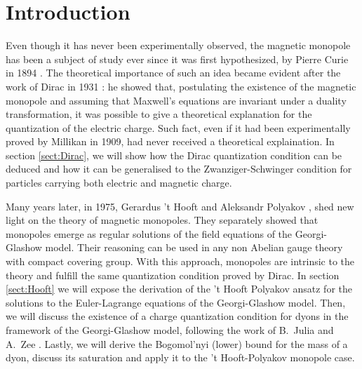 \documentclass[main.tex]{subfiles}
\begin{document}
\section{Introduction}

Even though it has never been experimentally observed, the magnetic monopole has been a subject of study ever since it was first hypothesized, by Pierre Curie in 1894 \cite{Curie:Monopole}.
The theoretical importance of such an idea became evident after the work of Dirac in 1931 \cite{Dirac}: he showed that, postulating the existence of the magnetic monopole and assuming that Maxwell's equations are invariant under a duality transformation, it was possible to give a theoretical explanation for the quantization of the electric charge.
Such fact, even if it had been experimentally proved by Millikan in 1909, had never received a theoretical explaination.
In section \ref{sect:Dirac}, we will show how the Dirac quantization condition can be deduced and how it can be generalised to the Zwanziger-Schwinger condition for particles carrying both electric and magnetic charge.

Many years later, in 1975, Gerardus 't Hooft \cite{Hof:mon} and Aleksandr Polyakov \cite{Pol:mon}, shed new light on the theory of magnetic monopoles.
They separately showed that monopoles emerge as regular solutions of the field equations of the Georgi-Glashow model. 
Their reasoning can be used in any non Abelian gauge theory with compact covering group.
With this approach, monopoles are intrinsic to the theory and fulfill the same quantization condition proved by Dirac.
In section \ref{sect:Hooft} we will expose the derivation of the 't Hooft Polyakov ansatz for the solutions to the Euler-Lagrange equations of the Georgi-Glashow model.
Then, we will discuss the existence of a charge quantization condition for dyons in the framework of the Georgi-Glashow model, following the work of B.\ Julia and A.\ Zee \cite{Julia:Dyon}.
Lastly, we will derive the Bogomol'nyi (lower) bound for the mass of a dyon, discuss its saturation and apply it to the 't Hooft-Polyakov monopole case. 

\end{document}

